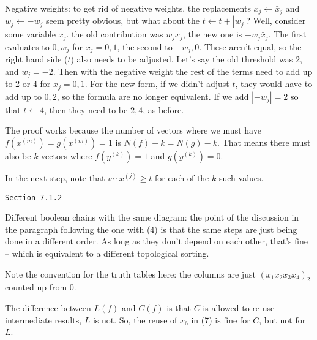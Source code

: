 \vskip0.1in \hfil\break

\noindent [p75] Negative weights: to get rid of negative weights,
the replacements $x_j \gets \bar x_j$ and $w_j \gets -w_j$ seem
pretty obvious, but what about the $t \gets t + \left|w_j\right|$?
Well, consider some variable $x_j$.  the old contribution was
$w_j x_j$, the new one is $-w_j \bar x_j$.  The first evaluates to
$0, w_j$ for $x_j = 0, 1$, the second to $-w_j, 0$.  These aren't
equal, so the right hand side ($t$) also needs to be adjusted.
Let's say the old threshold was 2, and $w_j = -2$.  Then with
the negative weight the rest of the terms need to add up to 2 or 4
for $x_j = 0, 1$.  For the new form, if we didn't adjust $t$, they
would have to add up to $0, 2$, so the formula are no longer
equivalent.  If we add $\left|-w_j\right| = 2$ so that $t \gets 4$,
then they need to be $2, 4$, as before.

\vskip 0.05in  \hfil\break
The proof works because the number
of vectors where we must have $f\left(x^{\left(m\right)}\right) = 
g\left(x^{\left(m\right)}\right) = 1$ is $N\left(f\right) - k = N\left(g\right) - k$.
That means there must also be $k$ vectors where $f\left(y^{\left(k\right)}\right) = 1$
and $g\left(y^{\left(k\right)}\right) = 0$.

In the next step, note that $w \cdot x^{\left(j\right)} \geq t$ for each of the $k$
such values. 

\vfil\break

\vskip 0.3in
\centerline{\tt Section 7.1.2}
\vskip0.2in


\noindent [p 97] Different boolean chains with the same diagram: the point
of the discussion in the paragraph following the one with (4) is that the same
steps are just being done in a different order.  As long as they don't depend
on each other, that's fine -- which is equivalent to a different topological sorting.

\vskip 0.05in \noindent [p 98] Note the convention for the truth tables here:
the columns are just $\left(x_1 x_2 x_3 x_4\right)_2$ counted up from 0.

\vskip 0.05in \noindent [p 99] The difference between $L\left(f\right)$
and $C\left(f\right)$ is that $C$ is allowed to re-use intermediate results,
$L$ is not.  So, the reuse of $x_6$ in (7) is fine for $C$, but not for $L$.

\vskip 0.1in 

